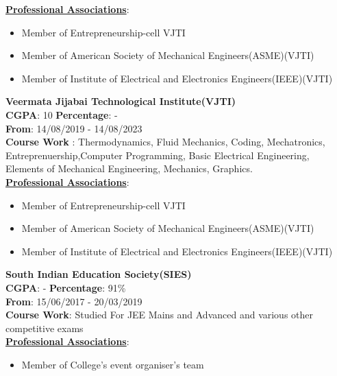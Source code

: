 \documentclass{article}
\begin{document}
{\begin{minipage}[t]{0.45\textwidth}
{{\textbf{\underline{Professional Associations}}}:
\begin{itemize}[noitemsep,nolistsep]
	
	\item Member of Entrepreneurship-cell VJTI
	\item Member of American Society of Mechanical Engineers(ASME)(VJTI)
	\item Member of Institute of Electrical and Electronics Engineers(IEEE)(VJTI)
	
\end{itemize}
\vspace{3pt}
{\textbf{Veermata Jijabai Technological Institute(VJTI)}}\\{\textbf{CGPA}}: 10 \hspace{30mm} {\textbf{Percentage}}: - \\ {\textbf{From}}: 14/08/2019 - 14/08/2023\\
{\textbf{Course Work}} : Thermodynamics, Fluid Mechanics, Coding, Mechatronics, Entreprenuership,Computer Programming, Basic Electrical Engineering, Elements of Mechanical Engineering, Mechanics, Graphics.\\


{\textbf{\underline{Professional Associations}}}:
\begin{itemize}[noitemsep,nolistsep]
	
	\item Member of Entrepreneurship-cell VJTI
	\item Member of American Society of Mechanical Engineers(ASME)(VJTI)
	\item Member of Institute of Electrical and Electronics Engineers(IEEE)(VJTI)
	
\end{itemize}
\vspace{3pt}
{\textbf{South Indian Education Society(SIES)}} \\
\textbf{CGPA}: -  \hspace{3cm}      \textbf{Percentage}: 91\% \\
\textbf{From}: 15/06/2017 - 20/03/2019 \\   
\textbf{Course Work}:
Studied For JEE Mains and Advanced and various other competitive exams \\
{\textbf{\underline{Professional Associations}}}:
\begin{itemize}[noitemsep,nolistsep]
	\item Member of College's event organiser's team
  
\end{itemize} 


}
\end{minipage}}
\end{document}
